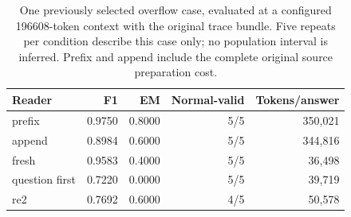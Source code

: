 \begin{table}[htbp]
\centering\small
\begin{tabular}{lrrrr}
\toprule
Reader & F1 & EM & Normal-valid & Tokens/answer\\
\midrule
prefix & 0.9750 & 0.8000 & 5/5 & 350,021\\
append & 0.8984 & 0.6000 & 5/5 & 344,816\\
fresh & 0.9583 & 0.4000 & 5/5 & 36,498\\
question first & 0.7220 & 0.0000 & 5/5 & 39,719\\
re2 & 0.7692 & 0.6000 & 4/5 & 50,578\\
\bottomrule
\end{tabular}
\caption{One previously selected overflow case, evaluated at a configured 196608-token context with the original trace bundle. Five repeats per condition describe this case only; no population interval is inferred. Prefix and append include the complete original source preparation cost.}
\label{tab:context-final}
\end{table}
